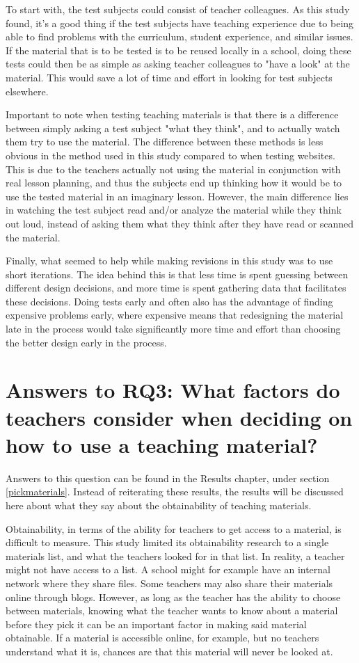 To start with, the test subjects could consist of teacher colleagues. As this study found, it's a good thing if the test subjects have teaching experience due to being able to find problems with the curriculum, student experience, and similar issues. If the material that is to be tested is to be reused locally in a school, doing these tests could then be as simple as asking teacher colleagues to "have a look" at the material. This would save a lot of time and effort in looking for test subjects elsewhere.

Important to note when testing teaching materials is that there is a difference between simply asking a test subject "what they think", and to actually watch them try to use the material. The difference between these methods is less obvious in the method used in this study compared to when testing websites. This is due to the teachers actually not using the material in conjunction with real lesson planning, and thus the subjects end up thinking how it would be to use the tested material in an imaginary lesson. However, the main difference lies in watching the test subject read and/or analyze the material while they think out loud, instead of asking them what they think after they have read or scanned the material.

Finally, what seemed to help while making revisions in this study was to use short iterations. The idea behind this is that less time is spent guessing between different design decisions, and more time is spent gathering data that facilitates these decisions. Doing tests early and often also has the advantage of finding expensive problems early, where expensive means that redesigning the material late in the process would take significantly more time and effort than choosing the better design early in the process.

\section{Answers to RQ3: What factors do teachers consider when deciding on how to use a teaching material?}

Answers to this question can be found in the Results chapter, under section \ref{pickmaterials}. Instead of reiterating these results, the results will be discussed here about what they say about the obtainability of teaching materials.

Obtainability, in terms of the ability for teachers to get access to a material, is difficult to measure. This study limited its obtainability research to a single materials list, and what the teachers looked for in that list. In reality, a teacher might not have access to a list. A school might for example have an internal network where they share files. Some teachers may also share their materials online through blogs. However, as long as the teacher has the ability to choose between materials, knowing what the teacher wants to know about a material before they pick it can be an important factor in making said material obtainable. If a material is accessible online, for example, but no teachers understand what it is, chances are that this material will never be looked at.

